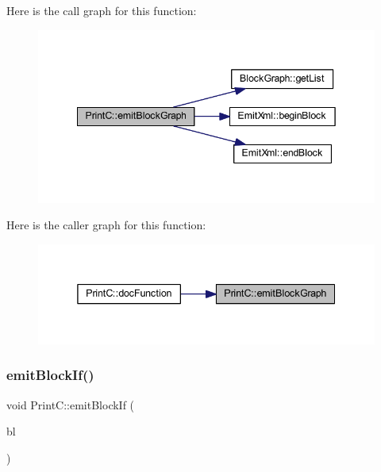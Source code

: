 Here is the call graph for this function\+:
\nopagebreak
\begin{figure}[H]
\begin{center}
\leavevmode
\includegraphics[width=342pt]{class_print_c_a44433ba4a36eb79bf55d717b209d0a86_cgraph}
\end{center}
\end{figure}
Here is the caller graph for this function\+:
\nopagebreak
\begin{figure}[H]
\begin{center}
\leavevmode
\includegraphics[width=338pt]{class_print_c_a44433ba4a36eb79bf55d717b209d0a86_icgraph}
\end{center}
\end{figure}
\mbox{\label{class_print_c_a8ec57580fdf84a0f9cff9d3e27c62254}} 
\subsubsection{\texorpdfstring{emitBlockIf()}{emitBlockIf()}}
{\footnotesize\ttfamily void Print\+C\+::emit\+Block\+If (\begin{DoxyParamCaption}\item[{const \mbox{\hyperlink{class_block_if}{Block\+If}} $\ast$}]{bl }\end{DoxyParamCaption})\hspace{0.3cm}{\ttfamily [virtual]}}



